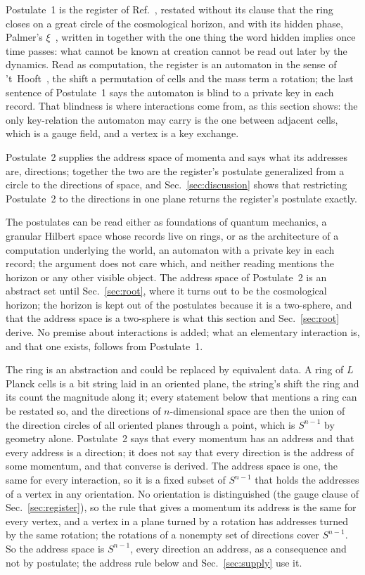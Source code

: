 \documentclass[aps,prd,twocolumn,superscriptaddress,nofootinbib]{revtex4-2}
\begin{document}
Postulate~1 is the register of Ref.~\cite{korytko2026c}, restated without its clause that the ring closes on a great circle of the cosmological horizon, and with its hidden phase, Palmer's $\xi$~\cite{palmer2026c}, written in together with the one thing the word hidden implies once time passes: what cannot be known at creation cannot be read out later by the dynamics. Read as computation, the register is an automaton in the sense of 't~Hooft~\cite{thooft2016}, the shift a permutation of cells and the mass term a rotation; the last sentence of Postulate~1 says the automaton is blind to a private key in each record. That blindness is where interactions come from, as this section shows: the only key-relation the automaton may carry is the one between adjacent cells, which is a gauge field, and a vertex is a key exchange.

Postulate~2 supplies the address space of momenta and says what its addresses are, directions; together the two are the register's postulate generalized from a circle to the directions of space, and Sec.~\ref{sec:discussion} shows that restricting Postulate~2 to the directions in one plane returns the register's postulate exactly.

The postulates can be read either as foundations of quantum mechanics, a granular Hilbert space whose records live on rings, or as the architecture of a computation underlying the world, an automaton with a private key in each record; the argument does not care which, and neither reading mentions the horizon or any other visible object. The address space of Postulate~2 is an abstract set until Sec.~\ref{sec:root}, where it turns out to be the cosmological horizon; the horizon is kept out of the postulates because it is a two-sphere, and that the address space is a two-sphere is what this section and Sec.~\ref{sec:root} derive. No premise about interactions is added; what an elementary interaction is, and that one exists, follows from Postulate~1.

The ring is an abstraction and could be replaced by equivalent data. A ring of $L$ Planck cells is a bit string laid in an oriented plane, the string's shift the ring and its count the magnitude along it; every statement below that mentions a ring can be restated so, and the directions of $n$-dimensional space are then the union of the direction circles of all oriented planes through a point, which is $S^{n-1}$ by geometry alone. Postulate~2 says that every momentum has an address and that every address is a direction; it does not say that every direction is the address of some momentum, and that converse is derived. The address space is one, the same for every interaction, so it is a fixed subset of $S^{n-1}$ that holds the addresses of a vertex in any orientation. No orientation is distinguished (the gauge clause of Sec.~\ref{sec:register}), so the rule that gives a momentum its address is the same for every vertex, and a vertex in a plane turned by a rotation has addresses turned by the same rotation; the rotations of a nonempty set of directions cover $S^{n-1}$. So the address space is $S^{n-1}$, every direction an address, as a consequence and not by postulate; the address rule below and Sec.~\ref{sec:supply} use it.
\end{document}
